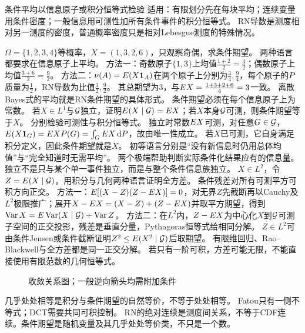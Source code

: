 \begin{method}{条件平均以信息原子或积分恒等式检验}
适用：有限划分先在每块平均；连续变量用条件密度；一般信息用可测性加所有条件事件的积分恒等式。
RN导数是测度相对另一测度的密度，普通概率密度只是相对Lebesgue测度的特殊情况。
\end{method}
{$\Omega=\{1,2,3,4\}$等概率，$X=(1,3,2,6)$，只观察奇偶，求条件期望。}
{两种语言都要求在信息原子上平均。}
{方法一：奇数原子$\{1,3\}$上均值$\frac{1+2}{2}=\frac{3}{2}$；偶数原子上均值$\frac{3+6}{2}=\frac{9}{2}$。
方法二：$\nu(A)=E(X\mathbf1_A)$在两个原子上分别为$\frac{3}{4},\frac{9}{4}$，每个原子的$P$质量为$\frac{1}{2}$，RN导数为比值$\frac{3}{2},\frac{9}{2}$。
其总期望为3，与$E X=\frac{1+3+2+6}{4}=3$一致。}
{离散Bayes式的平均就是RN条件期望的具体形式。}
{条件期望必须在每个信息原子上为常数。}
{若$X\in L^1$与$\mathcal G$独立，证明$E(X\mid\mathcal G)=E X$；若$X$本身$\mathcal G$可测，则条件期望等于$X$。}
{分别检验可测性与积分恒等式。}
{独立时常数$E X$可测，对任意$G\in\mathcal G$，$E(X\mathbf1_G)=E XP(G)=\int_GE X\,\mathrm dP$，故由唯一性成立。
若$X$已可测，它自身满足积分定义，因此条件期望就是$X$。
初等语言分别是“没有新信息时仍用总体均值”与“完全知道时无需平均”。}
{两个极端帮助判断实际条件化结果应有的信息量。}
{独立不是只与某个单一事件独立，而是与整个条件信息族独立。}
{$X\in L^2$，令$Z=E(X\mid\mathcal G)$。用积分与几何两种语言证明全方差。}
{条件残差对所有可测平方可积方向正交。}
{方法一：$E[(X-Z)(Z-E X)]=0$，对无界$Z$先截断再以Cauchy及$L^2$极限推广；展开$X-E X=(X-Z)+(Z-E X)$并取平方期望，得到$\operatorname{Var} X=E\operatorname{Var}(X\mid\mathcal G)+\operatorname{Var} Z$。
方法二：在$L^2$内，$Z-E X$为中心化$X$到$\mathcal G$可测子空间的正交投影，残差是垂直分量，Pythagoras恒等式给相同分解。
$Z\in L^2$可由条件Jensen或条件截断证明$Z^2\le E(X^2\mid\mathcal G)$后取期望。}
{有限维回归、Rao--Blackwell与全方差都是同一正交分解。}
{若只有一阶可积，方差可能无限，不能直接使用有限范数的几何恒等式。}
\begin{figure}[htbp]\centering
{}\caption{收敛关系图；一般逆向箭头均需附加条件}\label{fig:convergence}\end{figure}
\begin{warning}
几乎处处相等是积分与条件期望的自然等价，不等于处处相等。
Fatou只有一侧不等式；DCT需要共同可积控制。
RN的绝对连续是测度间关系，不等于CDF连续。条件期望是随机变量及其几乎处处等价类，不只是一个数。
\end{warning}

